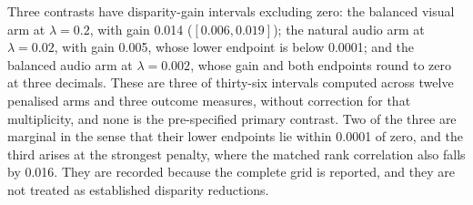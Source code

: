 Three contrasts have disparity-gain intervals excluding zero: the balanced visual arm at
$\lambda=0.2$, with gain 0.014 ($[0.006, 0.019]$); the natural audio arm at $\lambda=0.02$,
with gain 0.005, whose lower endpoint is below 0.0001; and the balanced audio arm at
$\lambda=0.002$, whose gain and both endpoints round to zero at three decimals. These are
three of thirty-six intervals computed across twelve penalised arms and three outcome
measures, without correction for that multiplicity, and none is the pre-specified primary
contrast. Two of the three are marginal in the sense that their lower endpoints lie within
0.0001 of zero, and the third arises at the strongest penalty, where the matched rank
correlation also falls by 0.016. They are recorded because the complete grid is reported,
and they are not treated as established disparity reductions.

